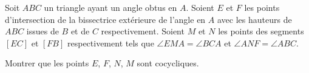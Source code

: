 Soit $ABC$ un triangle ayant un angle obtus en $A$. Soient $E$ et $F$ les points d'intersection de la bissectrice extérieure de l'angle en $A$ avec les hauteurs de $ABC$ issues de $B$ et de $C$ respectivement. Soient $M$ et $N$ les points des segments $[EC]$ et $[FB]$ respectivement tels que $\angle EMA = \angle BCA$ et $\angle ANF = \angle ABC$.

Montrer que les points $E$, $F$, $N$, $M$ sont cocycliques.
